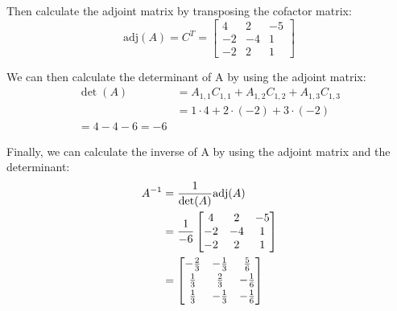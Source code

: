 Then calculate the adjoint matrix by transposing the cofactor matrix:
$$
	\text{adj}(A) = C^T = \begin{bmatrix}
		4  & 2  & -5 \\
		-2 & -4 & 1  \\
		-2 & 2  & 1
	\end{bmatrix}
$$

We can then calculate the determinant of A by using the adjoint matrix:
\begin{align*}
	\det(A) & = A_{1,1}C_{1,1} + A_{1,2}C_{1,2} + A_{1,3}C_{1,3} \\
	        & = 1\cdot 4 + 2\cdot (-2) + 3\cdot (-2)             \\
	= 4 - 4 - 6 = -6
\end{align*}

Finally, we can calculate the inverse of A by using the adjoint matrix and the determinant:
\begin{align*}
	A^{-1} & = \frac{1}{\det(A)}\text{adj}(A)                \\
	       & = \frac{1}{-6}\begin{bmatrix}
		                       4  & 2  & -5 \\
		                       -2 & -4 & 1  \\
		                       -2 & 2  & 1
	                       \end{bmatrix}                    \\
	       & = \begin{bmatrix}
		           -\gfrac{2}{3} & -\gfrac{1}{3} & \gfrac{5}{6}  \\
		           \gfrac{1}{3}  & \gfrac{2}{3}  & -\gfrac{1}{6} \\
		           \gfrac{1}{3}  & -\gfrac{1}{3} & -\gfrac{1}{6}
	           \end{bmatrix}
\end{align*}
